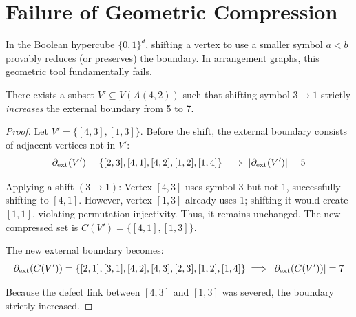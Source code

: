 \section{Failure of Geometric Compression}\label{sec:nogo}

In the Boolean hypercube $\{0,1\}^d$, shifting a vertex to use a smaller symbol
$a < b$ provably reduces (or preserves) the boundary. In arrangement graphs,
this geometric tool fundamentally fails.

\begin{theorem}\label{thm:nogo}
There exists a subset $V' \subseteq V(A(4,2))$ such that shifting symbol $3 \to
1$ strictly \emph{increases} the external boundary from 5 to 7.
\end{theorem}

\begin{proof}
Let $V' = \{[4,3], [1,3]\}$. Before the shift, the external boundary consists of
adjacent vertices not in $V'$:
	\begin{equation*}
		\partial_{\mathrm{ext}}(V') = \{[2,3], [4,1], [4,2], [1,2], [1,4]\} \implies \left| \partial_{\mathrm{ext}}(V') \right| = 5
	\end{equation*}

Applying a shift $(3 \to 1)$: Vertex $[4,3]$ uses symbol 3 but not 1,
successfully shifting to $[4,1]$. However, vertex $[1,3]$ already uses 1;
shifting it would create $[1,1]$, violating permutation injectivity. Thus, it
remains unchanged. The new compressed set is $C(V') = \{[4,1], [1,3]\}$.

	The new external boundary becomes:
	\begin{equation*}
		\partial_{\mathrm{ext}}(C(V')) = \{[2,1], [3,1], [4,2], [4,3], [2,3], [1,2], [1,4]\} \implies \left| \partial_{\mathrm{ext}}(C(V')) \right| = 7
	\end{equation*}

Because the defect link between $[4,3]$ and $[1,3]$ was severed, the boundary
strictly increased.
\end{proof}

